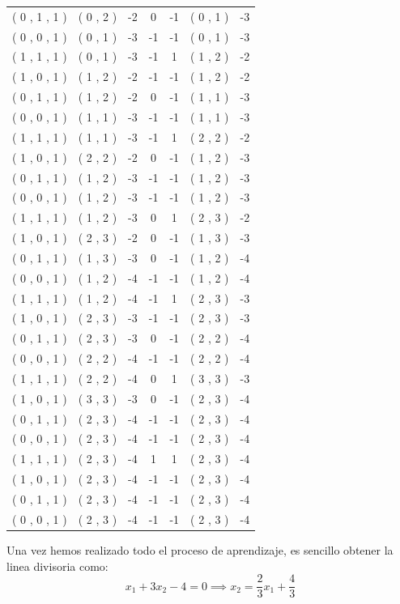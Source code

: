 \begin{problem}[11]
\begin{center}
\begin{tabular}{|c|c|c|c|c|c|c|}
( 0 , 1 , 1 ) & ( 0 , 2 ) &  -2  &  0  &  -1  & ( 0 , 1 ) &  -3  \\
( 0 , 0 , 1 ) & ( 0 , 1 ) &  -3  &  -1  &  -1  & ( 0 , 1 ) &  -3  \\
( 1 , 1 , 1 ) & ( 0 , 1 ) &  -3  &  -1  &  1  & ( 1 , 2 ) &  -2  \\
( 1 , 0 , 1 ) & ( 1 , 2 ) &  -2  &  -1  &  -1  & ( 1 , 2 ) &  -2  \\
( 0 , 1 , 1 ) & ( 1 , 2 ) &  -2  &  0  &  -1  & ( 1 , 1 ) &  -3  \\
( 0 , 0 , 1 ) & ( 1 , 1 ) &  -3  &  -1  &  -1  & ( 1 , 1 ) &  -3  \\
( 1 , 1 , 1 ) & ( 1 , 1 ) &  -3  &  -1  &  1  & ( 2 , 2 ) &  -2  \\
( 1 , 0 , 1 ) & ( 2 , 2 ) &  -2  &  0  &  -1  & ( 1 , 2 ) &  -3  \\
( 0 , 1 , 1 ) & ( 1 , 2 ) &  -3  &  -1  &  -1  & ( 1 , 2 ) &  -3  \\
( 0 , 0 , 1 ) & ( 1 , 2 ) &  -3  &  -1  &  -1  & ( 1 , 2 ) &  -3  \\
( 1 , 1 , 1 ) & ( 1 , 2 ) &  -3  &  0  &  1  & ( 2 , 3 ) &  -2  \\
( 1 , 0 , 1 ) & ( 2 , 3 ) &  -2  &  0  &  -1  & ( 1 , 3 ) &  -3  \\
( 0 , 1 , 1 ) & ( 1 , 3 ) &  -3  &  0  &  -1  & ( 1 , 2 ) &  -4  \\
( 0 , 0 , 1 ) & ( 1 , 2 ) &  -4  &  -1  &  -1  & ( 1 , 2 ) &  -4  \\
( 1 , 1 , 1 ) & ( 1 , 2 ) &  -4  &  -1  &  1  & ( 2 , 3 ) &  -3  \\
( 1 , 0 , 1 ) & ( 2 , 3 ) &  -3  &  -1  &  -1  & ( 2 , 3 ) &  -3  \\
( 0 , 1 , 1 ) & ( 2 , 3 ) &  -3  &  0  &  -1  & ( 2 , 2 ) &  -4  \\
( 0 , 0 , 1 ) & ( 2 , 2 ) &  -4  &  -1  &  -1  & ( 2 , 2 ) &  -4  \\
( 1 , 1 , 1 ) & ( 2 , 2 ) &  -4  &  0  &  1  & ( 3 , 3 ) &  -3  \\
( 1 , 0 , 1 ) & ( 3 , 3 ) &  -3  &  0  &  -1  & ( 2 , 3 ) &  -4  \\
( 0 , 1 , 1 ) & ( 2 , 3 ) &  -4  &  -1  &  -1  & ( 2 , 3 ) &  -4  \\
( 0 , 0 , 1 ) & ( 2 , 3 ) &  -4  &  -1  &  -1  & ( 2 , 3 ) &  -4  \\
( 1 , 1 , 1 ) & ( 2 , 3 ) &  -4  &  1  &  1  & ( 2 , 3 ) &  -4  \\
( 1 , 0 , 1 ) & ( 2 , 3 ) &  -4  &  -1  &  -1  & ( 2 , 3 ) &  -4  \\
( 0 , 1 , 1 ) & ( 2 , 3 ) &  -4  &  -1  &  -1  & ( 2 , 3 ) &  -4  \\
( 0 , 0 , 1 ) & ( 2 , 3 ) &  -4  &  -1  &  -1  & ( 2 , 3 ) &  -4  \\

\hline
\end{tabular}
\end{center}

Una vez hemos realizado todo el proceso de aprendizaje, es sencillo obtener la linea divisoria como:
\[x_1+3x_2-4 = 0 \implies x_2 = \frac{2}{3}x_1+\frac{4}{3}\]

\end{problem}

